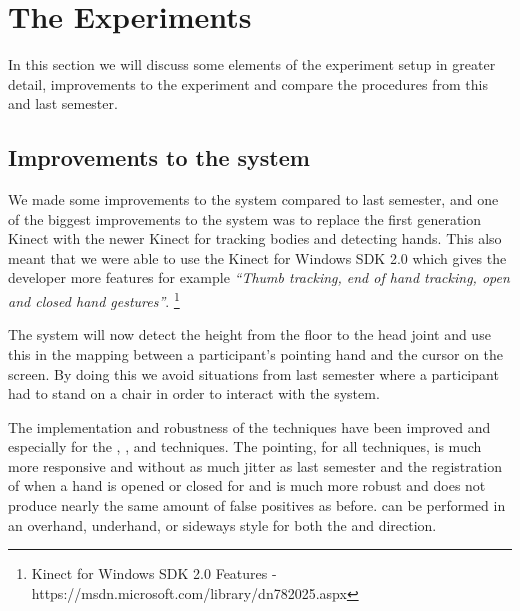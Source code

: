 \section*{The Experiments} \label{sec:experiments}
In this section we will discuss some elements of the experiment setup in greater detail, improvements to the experiment and compare the procedures from this and last semester.

\subsection*{Improvements to the system}\label{sec:systemImprovements}
We made some improvements to the system compared to last semester, and one of the biggest improvements to the system was to replace the first generation Kinect with the newer Kinect for tracking bodies and detecting hands.
This also meant that we were able to use the Kinect for Windows SDK 2.0 which gives the developer more features for example \textit{``Thumb tracking, end of hand tracking, open and closed hand gestures''}. \footnote{Kinect for Windows SDK 2.0 Features - https://msdn.microsoft.com/library/dn782025.aspx}

The system will now detect the height from the floor to the head joint and use this in the mapping between a participant's pointing hand and the cursor on the screen.
By doing this we avoid situations from last semester where a participant had to stand on a chair in order to interact with the system.

The implementation and robustness of the techniques have been improved and especially for the \grab, \throw, and \tilt techniques.
The pointing, for all techniques, is much more responsive and without as much jitter as last semester and the registration of when a hand is opened or closed for \grab \push and \grab \pull is much more robust and does not produce nearly the same amount of false positives as before.
\throw can be performed in an overhand, underhand, or sideways style for both the \pull and \push direction.


